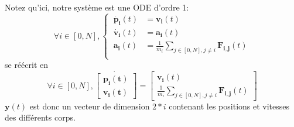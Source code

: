\documentclass{article}
\newcommand{\myvec}[1]{\ensuremath{\mathbf{#1}}}
\begin{document}
\noindent Notez qu'ici, notre système est une ODE d'ordre 1:
\begin{equation*}
    \forall i \in [0,N], \left\{\begin{aligned}
        \ \myvec{\dot{p_i}}(t) & = \myvec{v_i}(t) \\
        \ \myvec{\dot{v_i}}(t) & = \myvec{a_i}(t) \\
        \ \myvec{a_i}(t) & = \frac{1}{m_i} \sum_{j \in [0,N], j \ne i} \myvec{F_{i,j}}(t) \\
    \end{aligned}\right.
\end{equation*}
se réécrit en
\begin{equation*}
    \forall i \in [0,N], \myvec{\dot{\left[\begin{aligned}
        \myvec{p_i}(t) \\ \myvec{v_i}(t)
    \end{aligned}\right]}} =
    \left[\begin{gathered}
    \myvec{v_i}(t) \\ \frac{1}{m_i} \sum_{j \in [0,N], j \ne i} \myvec{F_{i,j}}(t)
    \end{gathered}\right]
\end{equation*}
$\myvec{y}(t)$ est donc un vecteur de dimension $2 * i$ contenant les positions et vitesses des différents corps.

\vspace{1em}
\end{document}
